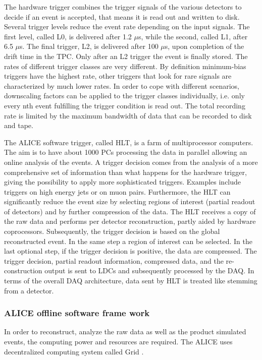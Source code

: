 The hardware trigger combines the trigger signals of the various detectors to decide if an event is accepted, that means it is read out and written to disk. Several trigger levels reduce the event rate depending on the input signals. The first level, called L0, is delivered after 1.2 $\mu$s, while the second, called L1, after 6.5 $\mu$s. The final trigger, L2, is delivered after 100 $\mu$s, upon completion of the drift time in the TPC. Only after an L2 trigger the event is finally stored. The rates of different trigger classes are very different. By definition minimum-bias triggers have the highest rate, other triggers that look for rare signals are characterized by much lower rates. In order to cope with different scenarios, downscaling factors can be applied to the trigger classes individually, i.e. only every nth event fulfilling the trigger condition is read out. The total recording rate is limited by the maximum bandwidth of data that can be recorded to disk and tape.

The ALICE software trigger, called HLT, is a farm of multiprocessor computers. The aim is to have about 1000 PCs processing the data in parallel allowing an online analysis of the events. A trigger decision comes from the analysis of a more comprehensive set of information than what happens for the hardware trigger, giving the possibility to apply more sophisticated triggers. Examples include triggers on high energy jets or on muon pairs. Furthermore, the HLT can significantly reduce the event size by selecting regions of interest (partial readout of detectors) and by further compression of the data. The HLT receives a copy of the raw data and performs per detector reconstruction, partly aided by hardware coprocessors. Subsequently, the trigger decision is based on the global reconstructed event. In the same step a region of interest can be selected. In the last optional step, if the trigger decision is positive, the data are compressed. The trigger decision, partial readout information, compressed data, and the re- construction output is sent to LDCs and subsequently processed by the DAQ. In terms of the overall DAQ architecture, data sent by HLT is treated like stemming from a detector.

\newpage
\subsubsection{ALICE offline software frame work}\label{label:alicesw}
In order to reconstruct, analyze the raw data as well as the product simulated events, the computing power and resources are required. The ALICE uses decentralized computing system called Grid \cite{cite:grid}.

